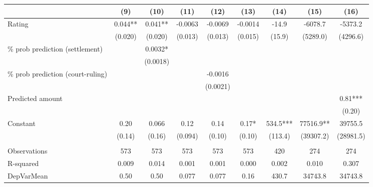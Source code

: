 \begin{tabular}{lcccccccc}
      & (9)   & (10)  & (11)  & (12)  & (13)  & (14)  & (15)  & (16) \\
\midrule
\midrule
Rating & 0.044** & 0.041** & -0.0063 & -0.0069 & -0.0014 & -14.9 & -6078.7 & -5373.2 \\
      & (0.020) & (0.020) & (0.013) & (0.013) & (0.015) & (15.9) & (5289.0) & (4296.6) \\
\% prob prediction (settlement) &       & 0.0032* &       &       &       &       &       &  \\
      &       & (0.0018) &       &       &       &       &       &  \\
\% prob prediction (court-ruling) &       &       &       & -0.0016 &       &       &       &  \\
      &       &       &       & (0.0021) &       &       &       &  \\
Predicted amount &       &       &       &       &       &       &       & 0.81*** \\
      &       &       &       &       &       &       &       & (0.20) \\
Constant & 0.20  & 0.066 & 0.12  & 0.14  & 0.17* & 534.5*** & 77516.9** & 39755.5 \\
      & (0.14) & (0.16) & (0.094) & (0.10) & (0.10) & (113.4) & (39307.2) & (28981.5) \\
      &       &       &       &       &       &       &       &  \\
\midrule
Observations & 573   & 573   & 573   & 573   & 573   & 420   & 274   & 274 \\
R-squared & 0.009 & 0.014 & 0.001 & 0.001 & 0.000 & 0.002 & 0.010 & 0.307 \\
DepVarMean & 0.50  & 0.50  & 0.077 & 0.077 & 0.16  & 430.7 & 34743.8 & 34743.8 \\
\bottomrule
\bottomrule
\end{tabular}%
